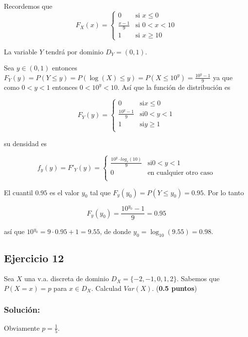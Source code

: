 \documentclass[
]{article}
\begin{document}
Recordemos que \[
F_X(x)=\left\{
\begin{array}{ll} 
0 & \mbox{si } x\leq 0\\
\frac{x-1}{9} & \mbox{si } 0< x < 10\\
1 & \mbox{si } x\geq 10
\end{array}\right.
\]

La variable \(Y\) tendrá por dominio \(D_Y=(0,1)\).

Sea \(y\in(0,1)\) entonces
\(F_Y(y)=P(Y\leq y)=P(\log(X)\leq y)=P(X\leq 10^y)=\frac{10^y-1}{9}\) ya
que como \(0<y<1\) entonces \(0< 10^y < 10\). Así que la función de
distribución es

\[
F_Y(y)=\left\{\begin{array}{ll} 
0 & \mbox{si} x\leq 0\\
\frac{10^y-1}{9} & \mbox{si} 0< y < 1\\
1 & \mbox{si} y\geq 1\\
\end{array}\right.
\]

su densidad es

\[
f_y(y)=F'_Y(y)=\left\{\begin{array}{ll} 
\frac{10^y\cdot log_e(10)}{9} & \mbox{si} 0< y < 1\\
0 & \mbox{en cualquier otro caso}\\
\end{array}\right.
\]

El cuantil \(0.95\) es el valor \(y_0\) tal que
\(F_y(y_0)=P(Y\leq y_0)=0.95\). Por lo tanto

\[F_y(y_0)=\frac{10^{y_0}-1}{9}=0.95\]

así que \(10^{y_0}=9\cdot 0.95+1=9.55\), de donde
\(y_0=\log_{10}(9.55)=0.98.\)

\hypertarget{ejercicio-12}{%
\subsection{Ejercicio 12}\label{ejercicio-12}}

Sea \(X\) una v.a. discreta de dominio \(D_X=\{-2,-1,0,1,2\}\). Sabemos
que \(P(X=x)=p\) para \(x\in D_X\). Calculad \(Var(X)\). (\textbf{0.5
puntos})

\hypertarget{soluciuxf3n-11}{%
\subsubsection{Solución:}\label{soluciuxf3n-11}}

Obviamente \(p=\frac{1}{5}.\)
\end{document}
